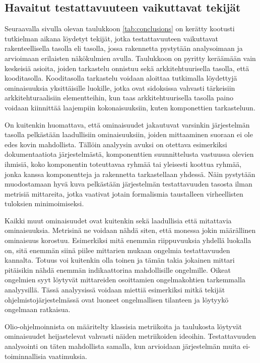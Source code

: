 \documentclass[finnish]{tktltiki2}
\numberwithin{table}{section}
\theoremstyle{definition}
\theoremstyle{remark}
\begin{document}
\subsection{Havaitut testattavuuteen vaikuttavat tekijät}

Seuraavalla sivulla olevan taulukkoon \ref{tab:conclusions} on kerätty kootusti tutkielman aikana löydetyt tekijät, jotka testattavuuteen vaikuttavat rakenteellisella tasolla eli tasolla, jossa rakennetta pystytään analysoimaan ja arvioimaan erilaisten näkökulmien avulla. Taulukkoon on pyritty keräämään vain keskeisiä asioita, joiden tarkastelu onnistuu sekä arkkitehtuurisella tasolla, että kooditasolla. Kooditasolla tarkastelu voidaan aloittaa tutkimalla löydettyjä ominaisuuksia yksittäisille luokille, jotka ovat sidoksissa vahvasti tärkeisiin arkkitehturaalisiin elementteihin, kun taas arkkitehtuurisella tasolla paino voidaan kiinnittää laajempiin kokonaisuuksiin, kuten komponettien tarkasteluun.  

On kuitenkin huomattava, että ominaisuudet jakautuvat varsinkin järjestelmän tasolla pelkästään laadullisiin ominaisuuksiin, joiden mittaaminen suoraan ei  ole edes kovin mahdollista. Tällöin analyysin avuksi on otettava esimerkiksi dokumentaatiota järjestelmästä, komponenttien suunnittelusta vastuussa olevien ihmisiä, koko komponentin toteuttavaa ryhmää tai yleisesti koottua ryhmää, jonka kanssa komponentteja ja rakennetta tarkastellaan yhdessä. Näin pystytään muodostamaan hyvä kuva pelkästään järjestelmän testattavuuden tasosta ilman metrisiä mittareita, jotka vaativat jotain formalismia taustalleen virheellisten tuloksien minimoimiseksi.

Kaikki muut ominaisuudet ovat kuitenkin sekä laadullisia että mitattavia ominaisuuksia. Metrisinä ne voidaan nähdä siten, että monessa jokin määrällinen ominaisuus korostuu. Esimerkiksi mitä enemmän riippuvuuksia yhdellä luokalla on, sitä enemmän siinä piilee mittarien mukaan ongelmia testattavuuden kannalta. Totuus voi kuitenkin olla toinen ja tämän takia jokainen mittari pitäisikin nähdä enemmän indikaattorina mahdollisille ongelmille. Oikeat ongelmien syyt löytyvät mittareiden osoittamien ongelmakohtien tarkemmalla analyysillä. Tässä analyysissä voidaan miettiä esimerkiksi mitkä tekijät ohjelmistojärjestelmässä ovat luoneet ongelmallisen tilanteen ja löytyykö ongelmaan ratkaisua. 

Olio-ohjelmoinnista on määritelty klassisia metriikoita \citep{chidamber_metricssuite_1994} ja taulukosta löytyvät ominaisuudet heijastelevat vahvasti näiden metriikoiden ideoihin. Testattavuuden analysointi on täten mahdollista samalla, kun arvioidaan järjestelmän muita ei-toiminnallisia vaatimuksia.
\end{document}
